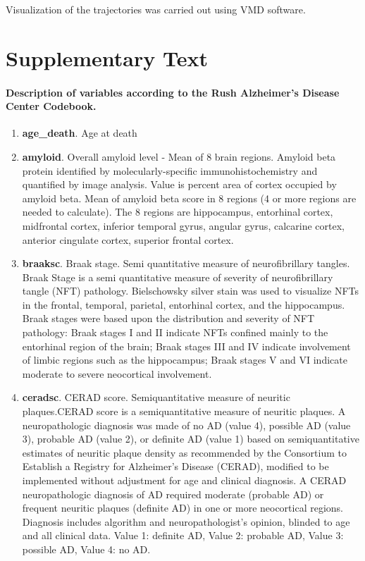 \documentclass[12pt]{article}
\begin{document}
Visualization of the trajectories was carried out using VMD software. 
 
\clearpage

\section{Supplementary Text}
\label{sec:supplementary_text}
\paragraph{Description of variables according to the Rush Alzheimer’s Disease Center Codebook.}
\begin{enumerate}
    \item \textbf{age\_death}. Age at death
    \item \textbf{amyloid}. Overall amyloid level - Mean of 8 brain regions. Amyloid beta protein identified by molecularly-specific immunohistochemistry and quantified by image analysis. Value is percent area of cortex occupied by amyloid beta. Mean of amyloid beta score in 8 regions (4 or more regions are needed to calculate). The 8 regions are hippocampus, entorhinal cortex, midfrontal cortex, inferior temporal gyrus, angular gyrus, calcarine cortex, anterior cingulate cortex, superior frontal cortex.
    \item \textbf{braaksc}. Braak stage. Semi quantitative measure of neurofibrillary tangles. Braak Stage is a semi quantitative measure of severity of neurofibrillary tangle (NFT) pathology. Bielschowsky silver stain was used to visualize NFTs in the frontal, temporal, parietal, entorhinal cortex, and the hippocampus. Braak stages were based upon the distribution and severity of NFT pathology: Braak stages I and II indicate NFTs confined mainly to the entorhinal region of the brain; Braak stages III and IV indicate involvement of limbic regions such as the hippocampus; Braak stages V and VI indicate moderate to severe neocortical involvement.
    \item \textbf{ceradsc}. CERAD score. Semiquantitative measure of neuritic plaques.CERAD score is a semiquantitative measure of neuritic plaques. A neuropathologic diagnosis was made of no AD (value 4), possible AD (value 3), probable AD (value 2), or definite AD (value 1) based on semiquantitative estimates of neuritic plaque density as recommended by the Consortium to Establish a Registry for Alzheimer’s Disease (CERAD), modified to be implemented without adjustment for age and clinical diagnosis. A CERAD neuropathologic diagnosis of AD required moderate (probable AD) or frequent neuritic plaques (definite AD) in one or more neocortical regions. Diagnosis includes algorithm and neuropathologist’s opinion, blinded to age and all clinical data. Value 1: definite AD, Value 2: probable AD, Value 3: possible AD, Value 4: no AD.

\end{enumerate}
\end{document}
